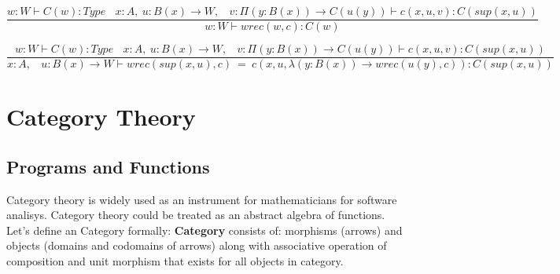 \documentclass[11pt,oneside]{article}
\begin{document}
\begin{equation}
\tag{$W$-elimination}
\dfrac
  {w: W \vdash C(w) : Type\ \ \ \ x:A,\ u:B(x) \rightarrow W,\ \ \ \ v:\Pi (y:B(x)) \rightarrow C(u(y)) \vdash c(x,u,v):C(sup(x,u))}
  {w:W \vdash wrec(w,c):C(w)}
\end{equation}

\begin{equation}
\tag{$W$-computation}
\dfrac
  {w: W \vdash C(w) : Type\ \ \ \ x:A,\ u:B(x) \rightarrow W,\ \ \ \ v:\Pi (y:B(x)) \rightarrow C(u(y)) \vdash c(x,u,v):C(sup(x,u))}
  {x:A,\ \ \ \ u:B(x) \rightarrow W \vdash wrec(sup(x,u),c)\ =\ c(x,u,\lambda (y:B(x)) \rightarrow wrec(u(y),c)):C(sup(x,u))}
\end{equation}

\newpage
\section{Category Theory}
\vspace{0.3cm}

   \subsection{Programs and Functions}
   Category theory is widely used as an instrument for mathematicians for software analisys.
   Category theory could be treated as an abstract algebra of functions. Let's define an Category
   formally: {\bf Category} consists of: morphisms (arrows) and objects (domains and codomains of arrows)
   along with associative operation of composition and unit morphism that exists for all objects in category.


\end{document}

